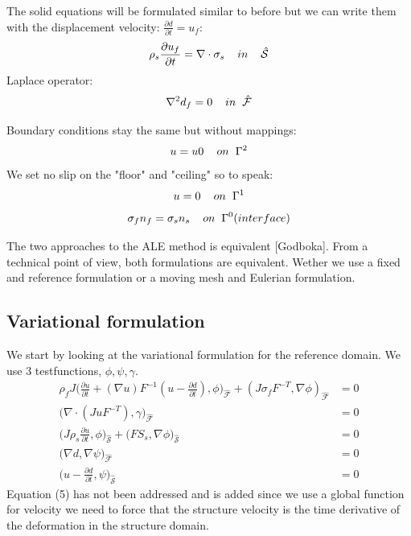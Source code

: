 The solid equations will be formulated similar to before but we can write them with the displacement velocity: $ \frac{\partial d}{\partial t} = u_f $:
$$ \rho_s \frac{\partial u_f}{\partial t} = \nabla \cdot \sigma_s \hspace{4mm}in\hspace{4mm} \mathcal{\hat{S}} $$
Laplace operator:
$$ \nabla^2 d_f = 0\hspace{4mm}in \hspace{2mm} \mathcal{\hat{F}}$$

Boundary conditions stay the same but without mappings:
$$ u = u0 \hspace{4mm}on \hspace{2mm} \Gamma^2$$
We set no slip on the "floor" and "ceiling" so to speak:
$$ u = 0  \hspace{4mm}on \hspace{2mm} \Gamma^1  $$
$$  \sigma_f n_f = \sigma_s n_s \hspace{4mm} on  \hspace{2mm}\Gamma^0 (interface)   $$

The two approaches to the ALE method is equivalent [Godboka]. 
From a technical point of view, both formulations are equivalent. Wether we use a fixed and reference formulation or a moving mesh and Eulerian formulation. 
\subsection*{Variational formulation}
We start by looking at the variational formulation for the reference domain.
We use 3 testfunctions, $\phi, \psi, \gamma$.
\begin{align}
\rho_f J \big( \frac{\partial u}{\partial t} + (\nabla u)F^{-1}(u-\frac{\partial d}{\partial t}) , \phi\big)_{\mathcal{\hat{F}}} + (J\sigma_f F^{-T},\nabla \phi )_{\mathcal{\hat{F}}} &= 0  \\
 \big( \nabla \cdot (J u F^{-T}),\gamma \big)_{\mathcal{\hat{F}}} &= 0 \\
\big(J\rho_s \frac{\partial u}{\partial t},\phi \big)_{\mathcal{\hat{S}}} + \big(F S_s, \nabla \phi \big)_{\mathcal{\hat{S}}} &=0 \\
 \big( \nabla d , \nabla \psi \big)_{\mathcal{\hat{F}}} &= 0 \\
 \big( u- \frac{\partial d}{\partial t} ,\psi \big)_{\mathcal{\hat{S}}} &= 0 
\end{align}
Equation (5) has not been addressed and is added since we use a global function for velocity we need to force that the structure velocity is the time derivative of the deformation in the structure domain. 




